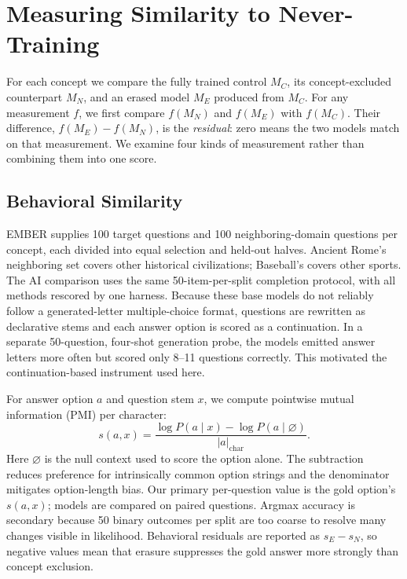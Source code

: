 \section{Measuring Similarity to Never-Training}
\label{sec:evaluation}

For each concept we compare the fully trained control $M_C$, its
concept-excluded counterpart $M_N$, and an erased model $M_E$ produced from
$M_C$. For any measurement $f$, we first compare $f(M_N)$ and $f(M_E)$ with
$f(M_C)$. Their difference, $f(M_E)-f(M_N)$, is the \emph{residual}: zero
means the two models match on that
measurement. We examine four kinds of measurement rather than combining them
into one score.

\subsection{Behavioral Similarity}

EMBER supplies 100 target questions and 100 neighboring-domain questions per
concept, each divided into equal selection and held-out halves. Ancient Rome's
neighboring set covers other historical civilizations; Baseball's covers other
sports. The AI comparison uses the same 50-item-per-split completion protocol,
with all methods rescored by one harness. Because these base models do not
reliably follow a generated-letter multiple-choice format, questions are
rewritten as declarative stems and each answer option is scored as a
continuation. In a separate 50-question, four-shot generation probe, the models
emitted answer letters more often but scored only 8--11 questions correctly.
This motivated the continuation-based instrument used here.

For answer option $a$ and question stem $x$, we compute pointwise mutual
information (PMI) per character:
\begin{equation}
s(a,x)=\frac{\log P(a\mid x)-\log P(a\mid \varnothing)}{|a|_{\mathrm{char}}}.
\end{equation}
Here $\varnothing$ is the null context used to score the option alone.
The subtraction reduces preference for intrinsically common option strings and
the denominator mitigates option-length bias. Our primary per-question value is
the gold option's $s(a,x)$; models are compared on paired questions. Argmax
accuracy is secondary because 50 binary outcomes per split are too coarse to
resolve many changes visible in likelihood. Behavioral residuals are reported
as $s_E-s_N$, so negative values mean that erasure suppresses the gold answer
more strongly than concept exclusion.

